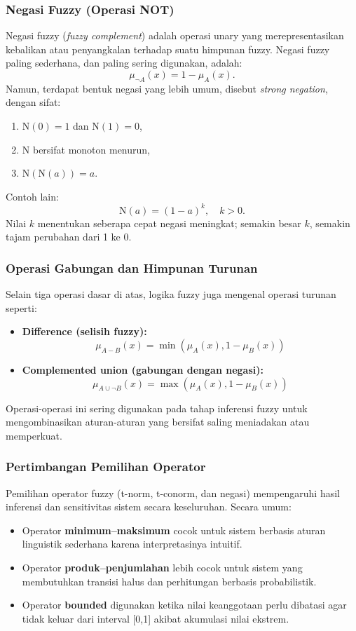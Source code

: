 \documentclass[12pt,a4paper]{article}
\theoremstyle{remark}
\begin{document}
\subsubsection{Negasi Fuzzy (Operasi NOT)}
Negasi fuzzy (\textit{fuzzy complement}) adalah operasi unary yang merepresentasikan kebalikan atau penyangkalan terhadap suatu himpunan fuzzy.
Negasi fuzzy paling sederhana, dan paling sering digunakan, adalah:
\[
    \mu_{\neg A}(x) = 1 - \mu_A(x).
\]
Namun, terdapat bentuk negasi yang lebih umum, disebut \textit{strong negation}, dengan sifat:
\begin{enumerate}
    \item \(\text{N}(0) = 1\) dan \(\text{N}(1) = 0\),
    \item \(\text{N}\) bersifat monoton menurun,
    \item \(\text{N}(\text{N}(a)) = a\).
\end{enumerate}
Contoh lain:
\[
    \text{N}(a) = (1 - a)^k, \quad k > 0.
\]
Nilai \(k\) menentukan seberapa cepat negasi meningkat; semakin besar \(k\), semakin tajam perubahan dari 1 ke 0.

\subsubsection{Operasi Gabungan dan Himpunan Turunan}
Selain tiga operasi dasar di atas, logika fuzzy juga mengenal operasi turunan seperti:
\begin{itemize}
    \item \textbf{Difference (selisih fuzzy):}
          \[
              \mu_{A - B}(x) = \min(\mu_A(x), 1 - \mu_B(x))
          \]
    \item \textbf{Complemented union (gabungan dengan negasi):}
          \[
              \mu_{A \cup \neg B}(x) = \max(\mu_A(x), 1 - \mu_B(x))
          \]
\end{itemize}
Operasi-operasi ini sering digunakan pada tahap inferensi fuzzy untuk mengombinasikan aturan-aturan yang bersifat saling meniadakan atau memperkuat.

\subsubsection{Pertimbangan Pemilihan Operator}
Pemilihan operator fuzzy (t-norm, t-conorm, dan negasi) mempengaruhi hasil inferensi dan sensitivitas sistem secara keseluruhan. Secara umum:
\begin{itemize}
    \item Operator \textbf{minimum–maksimum} cocok untuk sistem berbasis aturan linguistik sederhana karena interpretasinya intuitif.
    \item Operator \textbf{produk–penjumlahan} lebih cocok untuk sistem yang membutuhkan transisi halus dan perhitungan berbasis probabilistik.
    \item Operator \textbf{bounded} digunakan ketika nilai keanggotaan perlu dibatasi agar tidak keluar dari interval [0,1] akibat akumulasi nilai ekstrem.
\end{itemize}
\end{document}
